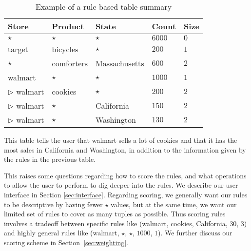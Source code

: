 \documentclass{sig-alternate}
\begin{document}
\begin{table}
\centering
\begin{tabular}{| l | l | l | l | l |}
\hline Store & Product & State & Count & Size \\
\hline
$\star$ & $\star$ & $\star$ & $6000$ & $0$ \\  \cline{1-5}
target & bicycles & $\star$ & $200$ & $1$ \\ \cline{1-5}
$\star$ & comforters & Massachusetts & $600$ & $2$ \\ \cline{1-5}
walmart & $\star$ & $\star$ & $1000$ & $1$ \\ \cline{2-5}
$\triangleright$ walmart & cookies & $\star$ & $200$ & $2$ \\ \cline{2-5}
$\triangleright$ walmart & $\star$ & California & $150$ & $2$ \\ \cline{2-5}
$\triangleright$ walmart & $\star$ & Washington & $130$ & $2$ \\ \hline
\end{tabular}
\caption{Example of a rule based table summary \label{table:introexample2}}
\end{table}

This table tells the user that walmart sells a lot of cookies and that it has the most sales in California and Washington, in addition to the information given by the rules in the previous table.

This raises some questions regarding how to score the rules, and what operations to allow the user to perform to dig deeper into the rules.
We describe our user interface in Section \ref{sec:interface}. Regarding scoring, we generally want our rules to be descriptive by having fewer $\star$ values, but at the same time, we want our limited set of rules to cover as many tuples as possible. Thus scoring rules involves a tradeoff between specific rules like (walmart, cookies, California, $30$, $3$) and highly general rules like (walmart, $\star$, $\star$, $1000$, $1$). We further discuss our scoring scheme in Section~\ref{sec:weighting}. 

\end{document}

